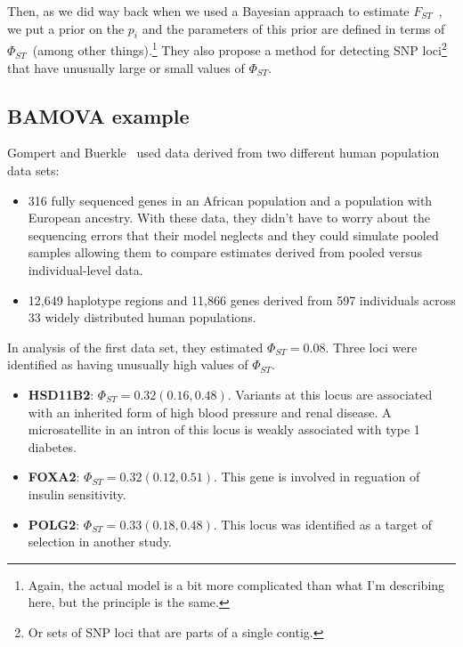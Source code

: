 Then, as we did way back when we used a Bayesian appraach to estimate
$F_{ST}$~\cite{Holsinger-Wallace-2004}, we put a prior on the $p_i$
and the parameters of this prior are defined in terms of
$\Phi_{ST}$~(among other things).\footnote{Again, the actual model is
  a bit more complicated than what I'm describing here, but the
  principle is the same.} They also propose a method for detecting SNP
loci\footnote{Or sets of SNP loci that are parts of a single contig.}
that have unusually large or small values of $\Phi_{ST}$.

\subsection*{BAMOVA example}

Gompert and Buerkle~\cite{Gompert-Buerkle-2011} used data derived from
two different human population data sets:

\begin{itemize}

\item 316 fully sequenced genes in an African population and a
  population with European ancestry. With these data, they didn't have
  to worry about the sequencing errors that their model neglects and
  they could simulate pooled samples allowing them to compare
  estimates derived from pooled versus individual-level data.

\item 12,649 haplotype regions and 11,866 genes derived from 597
  individuals across 33 widely distributed human populations.

\end{itemize}

In analysis of the first data set, they estimated
$\Phi_{ST}=0.08$. Three loci were identified as having unusually high
values of $\Phi_{ST}$. 

\begin{itemize}

\item {\bf HSD11B2}: $\Phi_{ST}=0.32 (0.16,0.48)$. Variants at this
  locus are associated with an inherited form of high blood pressure
  and renal disease. A microsatellite in an intron of this locus is
  weakly associated with type 1 diabetes.

\item {\bf FOXA2}: $\Phi_{ST}=0.32 (0.12,0.51)$. This gene is involved
  in reguation of insulin sensitivity.

\item {\bf POLG2}: $\Phi_{ST}=0.33 (0.18,0.48)$. This locus was
  identified as a target of selection in another study.

\end{itemize}

